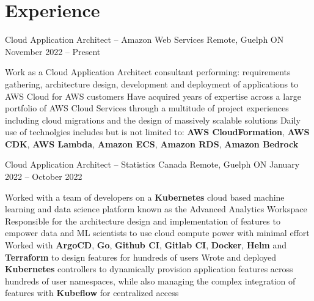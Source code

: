 \documentclass[a4paper,11pt]{article}
\begin{document}
\sectionsep
\section{Experience}
\begin{subheading}

	\resumeExp
	{Cloud Application Architect -- Amazon Web Services}
	{Remote, Guelph ON}
	{November 2022 -- Present}
	{}
	\begin{entries}
        \ib Work as a Cloud Application Architect consultant performing: requirements gathering, architecture
        design, development and deployment of applications to AWS Cloud for AWS customers
        \ib Have acquired years of expertise across a large portfolio of AWS Cloud Services
        through a multitude of project experiences including cloud migrations and the design
        of massively scalable solutions
        \ib Daily use of technolgies includes but is not limited to: \textbf{AWS CloudFormation}, 
        \textbf{AWS CDK}, \textbf{AWS Lambda}, \textbf{Amazon ECS}, \textbf{Amazon RDS}, \textbf{Amazon Bedrock}
    \end{entries}

	\resumeExp
	{Cloud Application Architect -- Statistics Canada}
	{Remote, Guelph ON}
	{January 2022 -- October 2022}
	{}
	\begin{entries}
		\ib Worked with a team of developers on a \textbf{Kubernetes} cloud based machine learning and data science
		platform known as the Advanced Analytics Workspace
		\href{https://analytics-platform.statcan.gc.ca/covid19}{\footnotesize{\faExternalLink}}
		\ib Responsible for the architecture design and implementation of features to  empower data and ML scientists to
		use cloud compute power with  minimal effort
		\ib Worked with \textbf{ArgoCD}, \textbf{Go}, \textbf{Github CI}, \textbf{Gitlab CI}, \textbf{Docker}, \textbf{Helm} and
		\textbf{Terraform} to design features for hundreds of users
		\ib Wrote and deployed \textbf{Kubernetes} controllers to dynamically provision application
		features across hundreds of user namespaces, while
		also managing the complex integration of features with \textbf{Kubeflow} for centralized access
	\end{entries}


\end{subheading}
\end{document}
